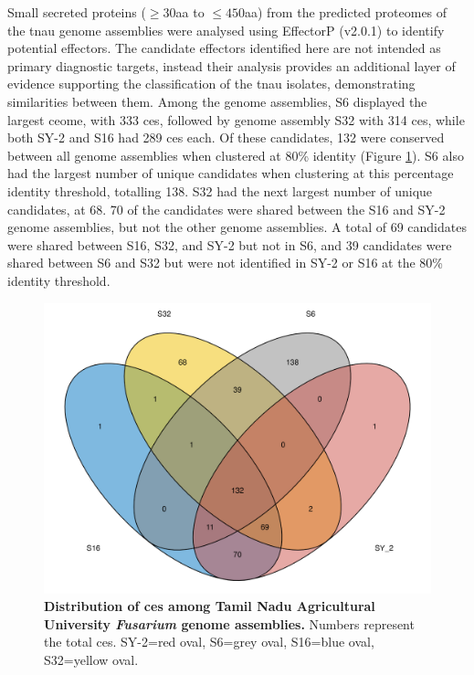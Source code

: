 Small secreted proteins ($\geq30$aa to $\leq450$aa)  from the predicted proteomes of the \ac{tnau} genome assemblies were analysed using EffectorP (v2.0.1) to identify potential effectors. The candidate effectors identified here are not intended as primary diagnostic targets, instead their analysis provides an additional layer of evidence supporting the classification of the \ac{tnau} isolates, demonstrating similarities between them. Among the genome assemblies, S6 displayed the largest \acl{ce}ome, with 333 \acp{ce}, followed by genome assembly S32 with 314 \acp{ce}, while both SY-2 and S16 had 289 \acp{ce} each. Of these candidates, 132 were conserved between all genome assemblies when clustered at 80\% identity (Figure \ref{fig:TNAUVenn}). S6 also had the largest number of unique candidates when clustering at this percentage identity threshold, totalling 138. S32 had the next largest number of unique candidates, at 68. 70 of the candidates were shared between the S16 and SY-2 genome assemblies, but not the other genome assemblies. A total of 69 candidates were shared between S16, S32, and SY-2 but not in S6, and 39 candidates were shared between S6 and S32 but were not identified in SY-2 or S16 at the  80\% identity threshold. 

\begin{figure}[hp!]
  \centering
  \includegraphics[width=\textwidth]{Figures/sharedCandEffsVenn.png}
  \caption[Distribution of \acp{ce} among Tamil Nadu Agricultural University \textit{Fusarium} genome assemblies.]{\textbf{Distribution of \acp{ce} among Tamil Nadu Agricultural University \textit{Fusarium} genome assemblies.} Numbers represent the total \acp{ce}. SY-2=red oval, S6=grey oval, S16=blue oval, S32=yellow oval.}
  \label{fig:TNAUVenn}
\end{figure}


